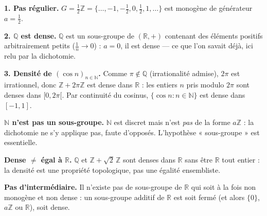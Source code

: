 
\begin{mdframed}[style=exbar]
  \textbf{1. Pas régulier.}\enspace%
  $G = \frac{1}{2}\mathbb{Z} = \{\ldots,-1,-\tfrac12,0,\tfrac12,1,\ldots\}$ est
  monogène de générateur $a = \tfrac12$.

  \smallskip\noindent
  \textbf{2. $\mathbb{Q}$ est dense.}\enspace%
  $\mathbb{Q}$ est un sous-groupe de $(\mathbb{R},+)$ contenant des éléments
  positifs arbitrairement petits ($\tfrac1n \to 0$) : $a = 0$, il est dense
  --- ce que l'on savait déjà, ici relu par la dichotomie.

  \smallskip\noindent
  \textbf{3. Densité de $(\cos n)_{n\in\mathbb{N}}$.}\enspace%
  Comme $\pi \notin \mathbb{Q}$ (irrationalité admise), $2\pi$ est irrationnel, donc
  $\mathbb{Z} + 2\pi\mathbb{Z}$ est dense dans $\mathbb{R}$ : les entiers $n$ pris
  modulo $2\pi$ sont denses dans $[0,2\pi[$. Par continuité du cosinus,
  $\{\cos n : n \in \mathbb{N}\}$ est dense dans $[-1,1]$.
\end{mdframed}

\decsep{}



\begin{mdframed}[style=cexbar]
  \textbf{$\mathbb{N}$ n'est pas un sous-groupe.}\enspace%
  $\mathbb{N}$ est discret mais n'est \emph{pas} de la forme $a\mathbb{Z}$ : la
  dichotomie ne s'y applique pas, faute d'opposés. L'hypothèse « sous-groupe »
  est essentielle.

  \smallskip\noindent
  \textbf{Dense $\neq$ égal à $\mathbb{R}$.}\enspace%
  $\mathbb{Q}$ et $\mathbb{Z}+\sqrt2\,\mathbb{Z}$ sont denses dans $\mathbb{R}$
  sans être $\mathbb{R}$ tout entier : la densité est une propriété topologique,
  pas une égalité ensembliste.

  \smallskip\noindent
  \textbf{Pas d'intermédiaire.}\enspace%
  Il n'existe pas de sous-groupe de $\mathbb{R}$ qui soit à la fois non monogène
  et non dense : un sous-groupe additif de $\mathbb{R}$ est soit fermé (et alors
  $\{0\}$, $a\mathbb{Z}$ ou $\mathbb{R}$), soit dense.
\end{mdframed}

\vspace{6pt}
\exolabel

